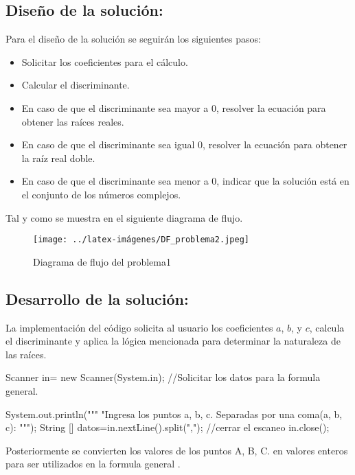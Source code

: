 \subsection{\textbf{Diseño de la solución:}}

Para el diseño de la solución se seguirán los siguientes pasos:
\begin{itemize}
    \item Solicitar los coeficientes para el cálculo.
    \item Calcular el discriminante.
    \item En caso de que el discriminante sea mayor a 0, resolver la ecuación para obtener las raíces reales.
    \item En caso de que el discriminante sea igual 0, resolver la ecuación para obtener la raíz real doble.
    \item En caso de que el discriminante sea menor a 0, indicar que la solución está en el conjunto de los números complejos.
\end{itemize}

Tal y como se muestra en el siguiente diagrama de flujo.

\begin{figure}[h!]
    \centering
    \texttt{[image: ../latex-imágenes/DF\_problema2.jpeg]}
    \caption{Diagrama de flujo del problema1}
    \label{fig:Diagramadeflujodel problema1}
\end{figure}

\subsection{\textbf{Desarrollo de la solución:}}
La implementación del código solicita al usuario los coeficientes \(a\), \(b\), y \(c\), calcula el discriminante y aplica la lógica mencionada para determinar la naturaleza de las raíces. 
\begin{javaCode}
 Scanner in= new Scanner(System.in);
        //Solicitar los datos para la formula general.
        
        System.out.println("""
                           "Ingresa los puntos a, b, c.
                           Separadas por una coma(a, b, c): 
                           """);
        String [] datos=in.nextLine().split(",");
        //cerrar el escaneo
        in.close();
        
\end{javaCode}
Posteriormente se convierten los valores de los puntos A, B, C. en valores enteros para ser utilizados  en la formula general .


